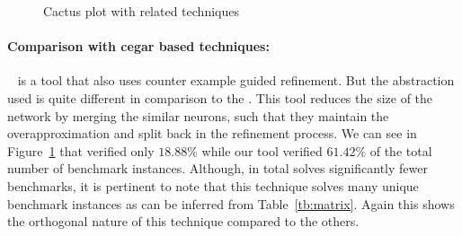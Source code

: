 




\begin{figure}[t]
  
  \caption{Cactus plot with related techniques}
  \label{res:milp_with_milp}
\end{figure}

\paragraph{Comparison with cegar based techniques: }
\cegarnn{}~\cite{elboher2020abstraction} is a tool that also uses  counter example guided refinement. But the abstraction used is quite different in comparison to the  \deeppoly{}. This tool reduces the size of the network by merging the similar neurons, such that they maintain the overapproximation and split back in the refinement process. We can see in Figure~\ref{res:milp_with_milp} that \cegarnn{} verified only  $18.88\%$ while our tool verified $61.42\%$ of the total number of benchmark instances. Although, in total \cegarnn{} solves significantly fewer benchmarks, it is pertinent to note that this technique solves many unique benchmark instances as can be inferred from Table~\ref{tb:matrix}. Again this shows the orthogonal nature of this technique compared to the others.%


